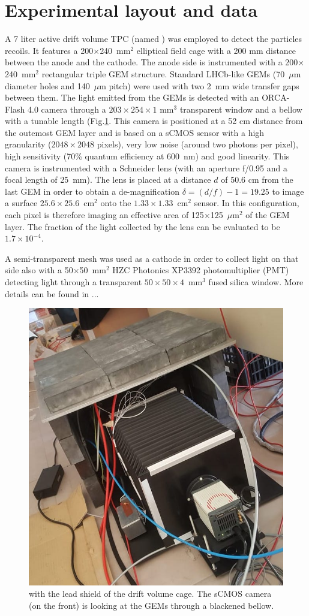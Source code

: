 \documentclass[12pt]{iopart}
\begin{document}
 \section{Experimental layout and data }
 A 7 liter active drift volume TPC  (named \lemon  \cite{paperBTF} ) was employed to detect the particles recoils. It 
features   a  200$\times$240~mm$^2$ elliptical field cage with a 200 mm distance between the anode and the cathode. The anode side is instrumented with a 200$\times$240~mm$^2$ rectangular triple  GEM structure.
Standard LHCb-like \cite{bib:thesis} GEMs  (70~$\mu$m diameter holes and 140~$\mu$m pitch) were used with two 2~mm wide transfer gaps between them. The light emitted from the GEMs is detected with   an ORCA-Flash 4.0 camera \cite{ORCAcamera} through a  $203\times254\times1$ mm$^3$ transparent window and a  bellow with a tunable length (Fig.\ref{fig:LemonShielded}.  This camera is positioned  at a 52 cm  distance from the outemost  GEM layer and is based on a sCMOS sensor with a high granularity ($2048\times2048$ pixels), very low noise (around two photons per pixel), high sensitivity (70\%  quantum efficiency at  600~nm) and good linearity. This camera is instrumented with a Schneider lens (with an aperture f/0.95 and a focal length of 25~mm). The lens is placed at a distance $d$ of 50.6 cm from the last GEM
in order to obtain a de-magnification
$\delta = (d/f) - 1 = 19.25$ to
image a surface $25.6 \times 25.6$~cm$^2$ onto the
$1.33 \times 1.33$~cm$^2$ sensor.
In this configuration, each pixel
 is therefore imaging  an effective area of 125$\times$125~$\mu$m$^2$ of the GEM layer. The fraction of the light collected by the lens can be evaluated \cite{bib:jinst_orange1} to be $1.7 \times 10^{-4}$.

A semi-transparent mesh was used as a cathode in order to collect light on that side also with a 50$\times$50~mm$^2$ HZC Photonics XP3392 photomultiplier \cite{PMTPhotonics} (PMT) detecting light through a transparent $50\times50\times4$~mm$^3$ fused silica window. More details can be found in ...


 
\begin{figure}[ht]
	\centering
	\includegraphics[width=0.45\linewidth]{LEMON-Shielded.jpg}
  	\caption{\lemon with the lead shield of the  drift volume cage. The sCMOS camera (on the front) is looking at the GEMs through a blackened bellow.}
  	\label{fig:LemonShielded}
\end{figure}
\end{document}
